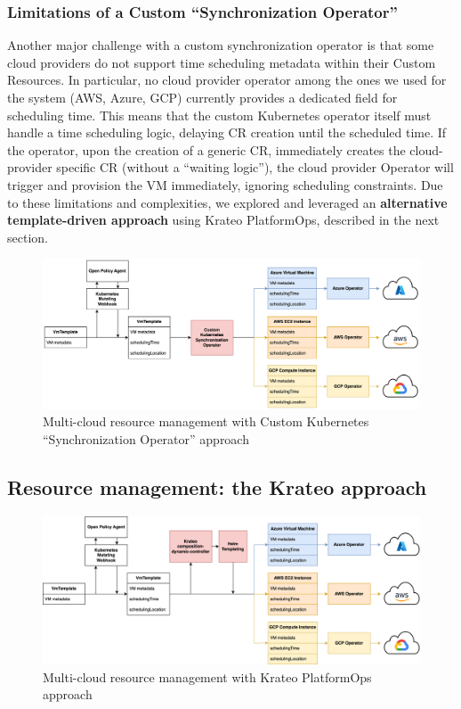 \subsubsection{Limitations of a Custom ``Synchronization Operator''}

Another major challenge with a custom synchronization operator is that some cloud providers do not support time scheduling metadata within their Custom Resources. 
In particular, no cloud provider operator among the ones we used for the system (AWS, Azure, GCP) currently provides a dedicated field for scheduling time.
This means that the custom Kubernetes operator itself must handle a time scheduling logic, delaying CR creation until the scheduled time.
If the operator, upon the creation of a generic CR, immediately creates the cloud-provider specific CR (without a ``waiting logic''), the cloud provider Operator will trigger and provision the VM immediately, ignoring scheduling constraints.
Due to these limitations and complexities, we explored and leveraged an \textbf{alternative template-driven approach} using Krateo PlatformOps, described in the next section.

\begin{figure}[htb]
  \centering
  \includegraphics[width=1\linewidth]{images/k8s_operator.png}
  \caption{Multi-cloud resource management with Custom Kubernetes ``Synchronization Operator'' approach}
  \label{fig:k8s_operator}
\end{figure}

\subsection{Resource management: the Krateo approach}

\begin{figure}[htb]
  \centering
  \includegraphics[width=1\linewidth]{images/krateo.png}
  \caption{Multi-cloud resource management with Krateo PlatformOps approach}
  \label{fig:krateo}
\end{figure}


